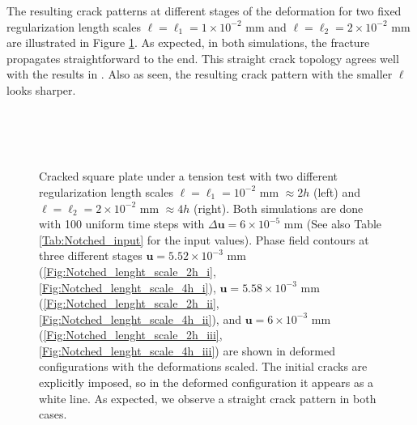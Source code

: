 The resulting crack patterns at different stages of the deformation for two fixed regularization length scales $\ell = \ell_1 = 1\times 10^{-2}$ mm and $\ell = \ell_2=2 \times 10^{-2}$ mm are illustrated in Figure \ref{Fig:Notched_snapshots}. 
As expected, in both simulations, the fracture propagates straightforward to the end. This straight crack topology agrees well with the results in \cite{miehe2010thermodynamically}. Also as seen, the resulting crack pattern with the smaller $\ell$ looks sharper.

\begin{figure}[!htb]
    \centering
    \\
    \\
	\\ 

    \caption{Cracked square plate under a tension test {with two different regularization length scales $\ell=\ell_1 = 10^{-2}$ mm $\approx 2h$ (left) and $\ell=\ell_2 = 2\times 10^{-2}$ mm $\approx 4h$ (right)}. Both simulations are done with 100 uniform time steps with $\Delta\bm{u}= 6 \times 10^{-5}$ mm (See also Table \ref{Tab:Notched_input} for the input values). Phase field contours at three different stages $\bm{u}=5.52 \times 10^{-3}$ mm (\ref{Fig:Notched_lenght_scale_2h_i},\ref{Fig:Notched_lenght_scale_4h_i}), $\bm{u}=5.58 \times 10^{-3}$ mm (\ref{Fig:Notched_lenght_scale_2h_ii},\ref{Fig:Notched_lenght_scale_4h_ii}), and $\bm{u}=6 \times 10^{-3}$ mm (\ref{Fig:Notched_lenght_scale_2h_iii},\ref{Fig:Notched_lenght_scale_4h_iii}) are shown in deformed configurations with the deformations scaled. The initial cracks are explicitly imposed, so in the deformed configuration it appears as a white line. As expected, we observe a straight crack pattern in both cases.
    }
    \label{Fig:Notched_snapshots}
\end{figure}


